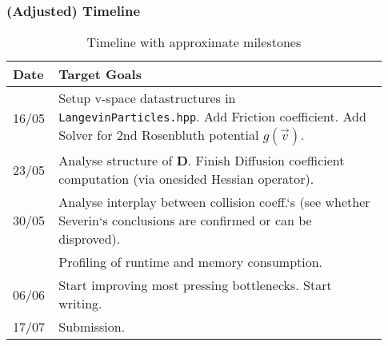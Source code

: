 \begin{frame}
\frametitle{(Adjusted) Timeline}
\begin{table}[]
\def\arraystretch{1.5}
\begin{tabular}{p{0.08\linewidth} | p{0.85\linewidth}}
Date & Target Goals \\
\hline \hline
16/05 & Setup v-space datastructures in \texttt{LangevinParticles.hpp}. Add Friction coefficient. Add Solver for 2nd Rosenbluth potential $g(\vec v)$.\\
23/05 & Analyse structure of $\boldsymbol D$. Finish Diffusion coefficient computation (via onesided Hessian operator). \\
30/05 & Analyse interplay between collision coeff.`s (see whether Severin`s conclusions are confirmed or can be disproved). \\
      & Profiling of runtime and memory consumption. \\
06/06 & Start improving most pressing bottlenecks. Start writing. \\
17/07 & Submission. \\
\end{tabular}
\caption{Timeline with approximate milestones}
\end{table}

\end{frame}


